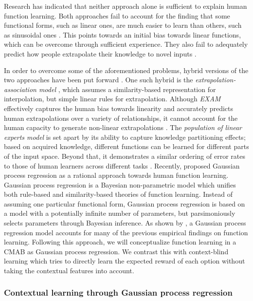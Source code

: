 \documentclass[a4paper,natbib]{apa6}
\begin{document}
Research has indicated that neither approach alone is sufficient to explain human function learning. Both approaches fail to account for the finding that some functional forms, such as linear ones, are much easier to learn than others, such as sinusoidal ones \citep{mcdaniel2005conceptual}. This points towards an initial bias towards linear functions, which can be overcome through sufficient experience. They also fail to adequately predict how people extrapolate their knowledge to novel inputs \citep{delosh1997extrapolation}.

In order to overcome some of the aforementioned problems, hybrid versions of the two approaches have been put forward \citep{mcdaniel2005conceptual}. One such hybrid is the \emph{extrapolation-association model} \citep[EXAM,][]{delosh1997extrapolation}, which assumes a similarity-based representation for interpolation, but simple linear rules for extrapolation. Although \emph{EXAM} effectively captures the human bias towards linearity and accurately predicts human extrapolations over a variety of relationships, it cannot account for the human capacity to generate non-linear extrapolations \citep{bott2004nonmonotonic}. The \emph{population of linear experts model} \citep[POLE,][]{kalish2004population} is set apart by its ability to capture knowledge partitioning effects; based on acquired knowledge, different functions can be learned for different parts of the input space. Beyond that, it demonstrates a similar ordering of error rates to those of human learners across different tasks \citep{mcdaniel2009predicting}. Recently, \cite{lucas2015rational} proposed Gaussian process regression as a rational approach towards human function learning. Gaussian process regression is a Bayesian non-parametric model which unifies both rule-based and similarity-based theories of function learning. Instead of assuming one particular functional form, Gaussian process regression is based on a model with a potentially infinite number of parameters, but parsimoniously selects parameters through Bayesian inference. As shown by \citeauthor{lucas2015rational}, a Gaussian process regression model accounts for many of the previous empirical findings on function learning. Following this approach, we will conceptualize function learning in a CMAB as Gaussian process regression. We contrast this with context-blind learning which tries to directly learn the expected reward of each option without taking the contextual features into account.

\subsubsection{Contextual learning through Gaussian process regression}
\end{document}
